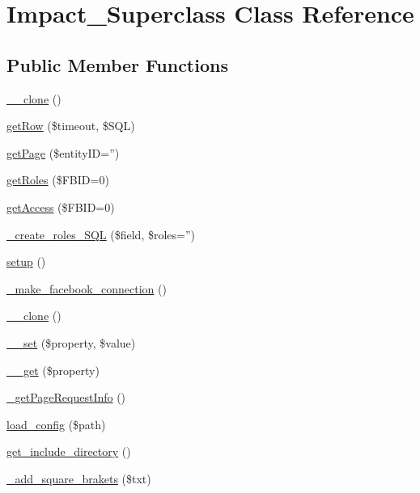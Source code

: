 \hypertarget{classImpact__Superclass}{
\section{Impact\_\-Superclass Class Reference}
\label{classImpact__Superclass}
}
\subsection*{Public Member Functions}
\begin{DoxyCompactItemize}
\item 
\hyperlink{classImpact__Superclass_ad0cb87b388bc74d63dc884accdca8713}{\_\-\_\-clone} ()
\item 
\hyperlink{classImpact__Superclass_a9945c96006a5b6b0f7a9616bc583699e}{getRow} (\$timeout, \$SQL)
\item 
\hyperlink{classImpact__Superclass_a1298c8e04eb0b7ee14c83f943057c5f9}{getPage} (\$entityID='')
\item 
\hyperlink{classImpact__Superclass_aca5aa43c8f7299f34139634dd1813556}{getRoles} (\$FBID=0)
\item 
\hyperlink{classImpact__Superclass_a797fe24addf6c8900aeb9eb15aff8c72}{getAccess} (\$FBID=0)
\item 
\hyperlink{classImpact__Superclass_ac9be16a907db4f8122071242957efd5e}{\_\-create\_\-roles\_\-SQL} (\$field, \$roles='')
\item 
\hyperlink{classImpact__Superclass_a1d04139db3a5ad5713ecbd14d97da879}{setup} ()
\item 
\hyperlink{classImpact__Superclass_ab2e18c82d6909c852402b07aa48340bc}{\_\-make\_\-facebook\_\-connection} ()
\item 
\hyperlink{classImpact__Superclass_ad0cb87b388bc74d63dc884accdca8713}{\_\-\_\-clone} ()
\item 
\hyperlink{classImpact__Superclass_a9b7f2b58fa3c9e81f142efb424433163}{\_\-\_\-set} (\$property, \$value)
\item 
\hyperlink{classImpact__Superclass_a6481e8cfc93c80885b3d72a6e1f15a1f}{\_\-\_\-get} (\$property)
\item 
\hyperlink{classImpact__Superclass_a17d34c36f889ed7235dc17000bc34a93}{\_\-getPageRequestInfo} ()
\item 
\hyperlink{classImpact__Superclass_aa0142dba3a229260d22d37308f9544f7}{load\_\-config} (\$path)
\item 
\hyperlink{classImpact__Superclass_ad0abe98dc00be95f647b055b6ad2ab49}{get\_\-include\_\-directory} ()
\item 
\hyperlink{classImpact__Superclass_a0c85fae0cdcc586cb407ba794178d889}{\_\-add\_\-square\_\-brakets} (\$txt)
\end{DoxyCompactItemize}
